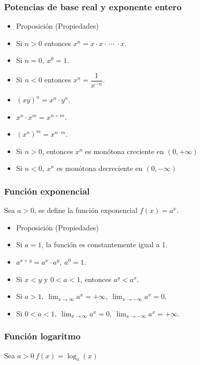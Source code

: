 \documentclass[12pt]{article}
\begin{document}
\subsubsection{Potencias de base real y exponente entero}
\begin{itemize}[label=\color{red}\textbullet, leftmargin=*]
	\item \color{lightblue}Proposición (Propiedades)
\end{itemize}
\begin{itemize}
	\item  Si $n>0$ entonces $x^n=x\cdot x\cdot~\cdots~\cdot x$.
	\item Si $n=0,~x^0=1$.
	\item Si $n<0$ entonces $x^n=\dfrac{1}{x^{-n}}$.
	\item $(xy)^n=x^n\cdot y^n$.
	\item $x^n\cdot x^m=x^{n+m}$.
	\item $ \left(x^n\right)^m=x^{n\cdot m}$.
	\item Si $n>0$, entonces $x^n$ es monótona creciente en $(0,+\infty)$
	\item Si $n<0,~x^n$ es monótona decreciente en $(0,-\infty)$
\end{itemize}
\subsubsection{Función exponencial}
Sea $a>0$, se define la función exponencial $f(x)=a^x$.
\begin{itemize}[label=\color{red}\textbullet, leftmargin=*]
	\item \color{lightblue}Proposición (Propiedades)
\end{itemize}
\begin{itemize}
	\item Si $a=1$, la función es constantemente igual a 1.
	\item $a^{x+y}=a^x\cdot a^y,~a^0=1$.
	\item Si $x<y$ y $0<a<1$, entonces $a^y<a^x$.
	\item Si $a>1,~\lim_{x\to\infty}a^x=+\infty,~\lim_{x\to-\infty}a^x=0$.
	\item Si $0<a<1,~\lim_{x\to\infty}a^x=0,~\lim_{x\to-\infty}a^x=+\infty$.
\end{itemize}
\subsubsection{Función logaritmo}
Sea $a>0~f(x)=\log_a(x)$
\end{document}
